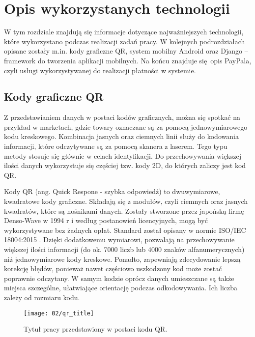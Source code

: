 \section{Opis wykorzystanych technologii}
W tym rozdziale znajdują się informacje dotyczące najważniejszych technologii, które wykorzystano podczas realizacji zadań pracy. W kolejnych podrozdziałach opisane zostały m.in. kody graficzne QR, system mobilny Android oraz Django -- framework do tworzenia aplikacji mobilnych. Na końcu znajduje się opis PayPala, czyli usługi wykorzystywanej do realizacji płatności w systemie.

\subsection{Kody graficzne QR}
Z przedstawianiem danych w postaci kodów graficznych, można się spotkać na przykład w marketach, gdzie towary oznaczane są za pomocą jednowymiarowego kodu kreskowego. Kombinacja jasnych oraz ciemnych linii służy do kodowania informacji, które odczytywane są za pomocą skanera z laserem. Tego typu metody stosuje się głównie w celach identyfikacji. Do przechowywania większej ilości danych wykorzystuje się częściej tzw. kody 2D, do których zaliczy jest kod QR.

Kody QR (ang. Quick Respone - szybka odpowiedź) to dwuwymiarowe, kwadratowe kody graficzne. Składają się z modułów, czyli ciemnych oraz jasnych kwadratów, które są nośnikami danych. Zostały stworzone przez japońską firmę Denso-Wave w 1994 r \cite{thonky_tutorial} i według postanowień licencyjnych, mogą być wykorzystywane bez żadnych opłat. Standard został opisany w normie ISO/IEC 18004:2015 \cite{norma_qr}. Dzięki dodatkowemu wymiarowi, pozwalają na przechowywanie większej ilości informacji (do ok. 7000 liczb lub 4000 znaków alfanumerycznych) niż jednowymiarowe kody kreskowe. Ponadto, zapewniają zdecydowanie lepszą korekcję błędów, ponieważ nawet częściowo uszkodzony kod może zostać poprawnie odczytany. W samym kodzie oprócz danych umieszczane są także miejsca szczególne, ułatwiające orientację podczas odkodowywania. Ich liczba zależy od rozmiaru kodu.

\begin{figure}[h]
	\begin{center}
		\texttt{[image: 02/qr\_title]}
	\end{center}
	\caption{Tytuł pracy przedstawiony w postaci kodu QR.}
	\vspace{-0.3cm}
\end{figure}

